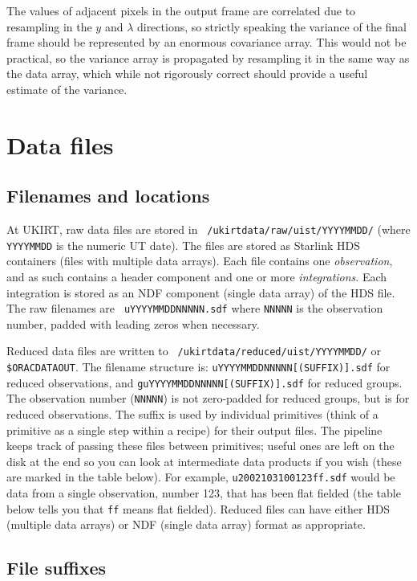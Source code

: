\documentclass[twoside,11pt]{article}
\renewcommand{\_}{\texttt{\symbol{95}}}
\begin{document}
The values of adjacent pixels in the output frame are correlated due
to resampling in the $y$ and $\lambda$ directions, so strictly
speaking the variance of the final frame should be represented by an
enormous covariance array. This would not be practical, so the
variance array is propagated by resampling it in the same way as the
data array, which while not rigorously correct should provide a
useful estimate of the variance.


\section{Data files}

\subsection{Filenames and locations}

At UKIRT, raw data files are stored in {\tt
  /ukirtdata/raw/uist/YYYYMMDD/} (where {\tt YYYYMMDD} is the numeric
UT date).  The files are stored as Starlink HDS containers (files
with multiple data arrays). Each file contains one \emph{observation},
and as such contains a header component and one or more
\emph{integrations}.  Each integration is stored as an NDF component
(single data array) of the HDS file. The raw filenames are {\tt
  uYYYYMMDD\_NNNNN.sdf} where {\tt NNNNN} is the observation number,
padded with leading zeros when necessary.

Reduced data files are written to {\tt
  /ukirtdata/reduced/uist/YYYYMMDD/} or {\tt \$ORAC\_DATA\_OUT}.  The
filename structure is: {\tt uYYYYMMDD\_NNNNN[\_(SUFFIX)].sdf} for reduced
observations, and {\tt guYYYYMMDD\_NNNNN[\_(SUFFIX)].sdf} for reduced
groups. The observation number ({\tt NNNNN}) is not zero-padded for
reduced groups, but is for reduced observations.
The suffix is used by individual primitives (think of a primitive as
a single step within a recipe) for their output files. The pipeline
keeps track of passing these files between primitives; useful ones are
left on the disk at the end so you can look at intermediate data
products if you wish (these are marked in the table below).
For example, {\tt u20021031\_00123\_ff.sdf} would be data from a single
observation, number 123, that has been flat fielded (the table below
tells you that {\tt \_ff} means flat fielded). Reduced files can have either
HDS (multiple data arrays) or NDF (single data array) format as
appropriate.

\subsection{File suffixes}
\end{document}
